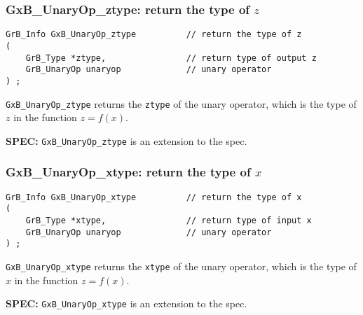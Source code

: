 \documentclass[12pt]{article}
\begin{document}

\newpage
\subsubsection{{\sf GxB\_UnaryOp\_ztype:} return the type of $z$}
\label{unaryop_ztype}

\begin{mdframed}[userdefinedwidth=6in]
{\footnotesize
\begin{verbatim}
GrB_Info GxB_UnaryOp_ztype          // return the type of z
(
    GrB_Type *ztype,                // return type of output z
    GrB_UnaryOp unaryop             // unary operator
) ;
\end{verbatim}
}\end{mdframed}

\verb'GxB_UnaryOp_ztype' returns the \verb'ztype' of the unary operator, which
is the type of $z$ in the function $z=f(x)$.

\begin{spec}
{\bf SPEC:} \verb'GxB_UnaryOp_ztype' is an extension to the spec.
\end{spec}

\subsubsection{{\sf GxB\_UnaryOp\_xtype:} return the type of $x$}
\label{unaryop_xtype}

\begin{mdframed}[userdefinedwidth=6in]
{\footnotesize
\begin{verbatim}
GrB_Info GxB_UnaryOp_xtype          // return the type of x
(
    GrB_Type *xtype,                // return type of input x
    GrB_UnaryOp unaryop             // unary operator
) ;
\end{verbatim}
}\end{mdframed}

\verb'GxB_UnaryOp_xtype' returns the \verb'xtype' of the unary operator, which
is the type of $x$ in the function $z=f(x)$.

\begin{spec}
{\bf SPEC:} \verb'GxB_UnaryOp_xtype' is an extension to the spec.
\end{spec}
\end{document}
